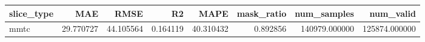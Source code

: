 \begin{tabular}{lrrrrrrr}
\toprule
slice_type & MAE & RMSE & R2 & MAPE & mask_ratio & num_samples & num_valid \\
\midrule
mmtc & 29.770727 & 44.105564 & 0.164119 & 40.310432 & 0.892856 & 140979.000000 & 125874.000000 \\
\bottomrule
\end{tabular}
